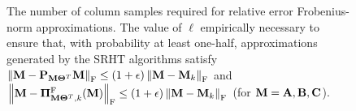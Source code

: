 \begin{figure}
 \centering
 \\%
 \\%
 \caption[The number of column samples required for relative error Frobenius-norm approximations]{
 {\sc The number of column samples required for relative error Frobenius-norm approximations.} The 
 value of $\ell$ empirically necessary to ensure that, with probability at least one-half, approximations generated
 by the SRHT algorithms satisfy $\left\|\mathbf{M} - \mathbf{P}_{\mathbf{M}\mathbf{\Theta}^T} \mathbf{M}\right\|_\mathrm{F} \leq (1 + \epsilon) \left\|\mathbf{M} - \mathbf{M}_k\right\|_\mathrm{F}$ and 
 $\left\|\mathbf{M} - \boldsymbol{\Pi}_{\mathbf{M}\mathbf{\Theta}^T, k}^{\mathrm{F}}(\mathbf{M})\right\|_\mathrm{F} \leq (1 + \epsilon) \left\|\mathbf{M} - \mathbf{M}_k\right\|_\mathrm{F}$ (for $\mathbf{M} = \mathbf{A}, \mathbf{B}, \mathbf{C}$).}
 \label{ch3:fig:empiricalrnecessary}
\end{figure}

